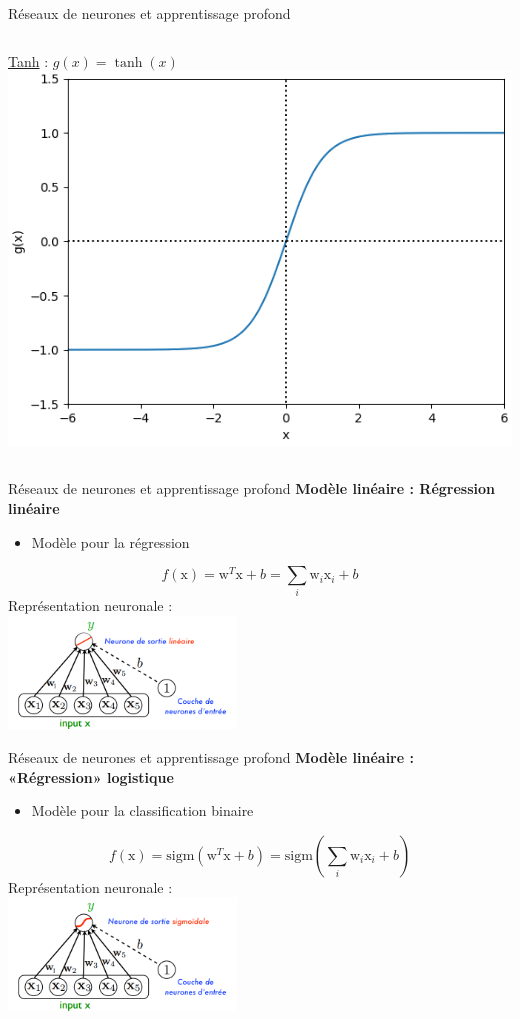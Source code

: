 \documentclass[french]{beamer}
\begin{document}
\begin{frame}{Réseaux de neurones et apprentissage profond}
\begin{columns}[T]
\begin{column}{.48\textwidth}
\begin{center}
\underline{Tanh} : $g(x) = \tanh(x)$\\
\includegraphics[width=.6\linewidth]{figures/tanh}
\end{center}
\end{column}
\end{columns}
\end{frame}

\begin{frame}{Réseaux de neurones et apprentissage profond}
\textbf{Modèle linéaire : Régression linéaire}
\vspace{0.5cm}
\begin{itemize}
	\item Modèle pour la régression
\end{itemize}
$$ f(\mathrm{x}) = \mathrm{w}^T\mathrm{x} + b = \sum_i \mathrm{w}_i \mathrm{x}_i + b $$
Représentation neuronale :\\
\centering
\includegraphics[height=3cm]{figures/linear_regression}
\end{frame}

\begin{frame}{Réseaux de neurones et apprentissage profond}
\textbf{Modèle linéaire : «Régression» logistique}
\vspace{0.5cm}
\begin{itemize}
	\item Modèle pour la classification binaire
\end{itemize}
$$ f(\mathrm{x}) = \mathrm{sigm}\left( \mathrm{w}^T\mathrm{x} + b \right) = \mathrm{sigm}\left( \sum_i \mathrm{w}_i \mathrm{x}_i + b \right) $$
Représentation neuronale :\\
\centering
\includegraphics[height=3cm]{figures/logistic_regression}
\end{frame}
\end{document}
